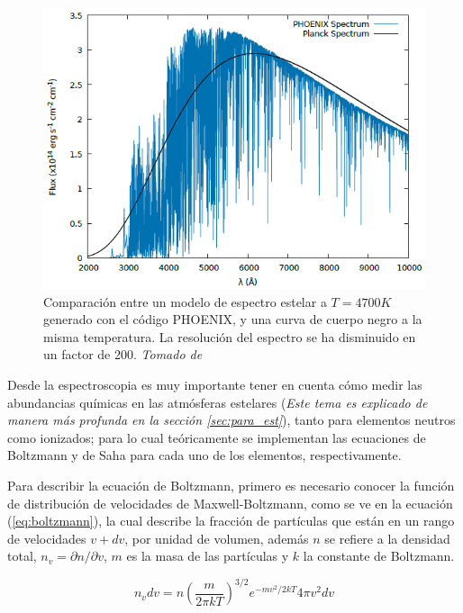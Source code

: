 \documentclass[12pt,oneside,openany,letter]{book}
\begin{document}
\begin{figure}[h]
    \centering
    \includegraphics[width=0.9\linewidth]{Images/lineblanck.PNG}
    \caption{Comparación entre un modelo de espectro estelar a $T = 4700 K$ generado con el código PHOENIX, y una curva de cuerpo negro a la misma temperatura. La resolución del espectro se ha disminuido en un factor de 200. \textit{Tomado de \citep{Faiber2019master}}}
    \label{fig:lineblanketing}
\end{figure}

\noindent Desde la espectroscopia es muy importante tener en cuenta cómo medir las abundancias químicas en las atmósferas estelares (\textit{Este tema es explicado de manera más profunda en la sección \ref{sec:para_est}}), tanto para elementos neutros como ionizados; para lo cual teóricamente se implementan las ecuaciones de Boltzmann y de Saha para cada uno de los elementos, respectivamente.
\vspace{2mm}

\noindent Para describir la ecuación de Boltzmann, primero es necesario conocer la función de distribución de velocidades de Maxwell-Boltzmann, como se ve en la ecuación (\ref{eq:boltzmann}), la cual describe la fracción de partículas que están en un rango de velocidades $v + dv$, por unidad de volumen, además $n$ se refiere a la densidad total, $n_v = \partial n / \partial v$, $m$ es la masa de las partículas y $k$ la constante de Boltzmann.

\begin{equation}
n_{v} d v=n\left(\frac{m}{2 \pi k T}\right)^{3 / 2} e^{-m v^{2} / 2 k T} 4 \pi v^{2} d v
\label{eq:boltzmann}
\end{equation}
\end{document}
